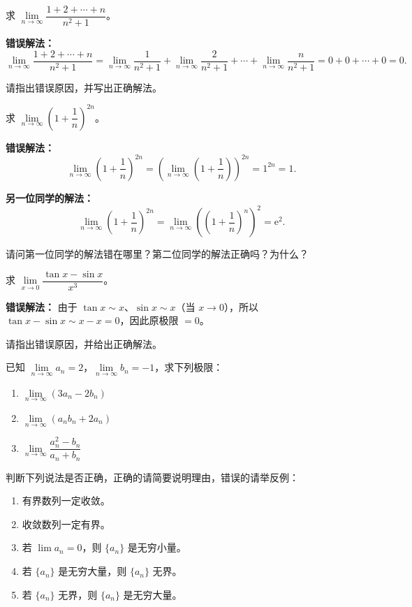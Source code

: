 \documentclass[fontset=fandol]{ctexart}
\newcommand{\ee}{\mathrm{e}}
\begin{document}
\begin{exercise}
求 \(\lim\limits_{n\to\infty} \dfrac{1 + 2 + \cdots + n}{n^2 + 1}\)。

\textbf{错误解法：}
\[
\lim_{n\to\infty} \dfrac{1 + 2 + \cdots + n}{n^2 + 1} = \lim_{n\to\infty} \dfrac{1}{n^2+1} + \lim_{n\to\infty} \dfrac{2}{n^2+1} + \cdots + \lim_{n\to\infty} \dfrac{n}{n^2+1} = 0 + 0 + \cdots + 0 = 0.
\]

请指出错误原因，并写出正确解法。
\end{exercise}

\begin{exercise}
求 \(\lim\limits_{n\to\infty} \left(1 + \dfrac{1}{n}\right)^{2n}\)。

\textbf{错误解法：}
\[
\lim_{n\to\infty} \left(1 + \dfrac{1}{n}\right)^{2n} = \left(\lim_{n\to\infty} \left(1 + \dfrac{1}{n}\right)\right)^{2n} = 1 ^{2n}=1.
\]

\textbf{另一位同学的解法：}
\[
\lim_{n\to\infty} \left(1 + \dfrac{1}{n}\right)^{2n} = \lim_{n\to\infty} \left(\left(1 + \dfrac{1}{n}\right)^n\right)^2 = \ee^2.
\]

请问第一位同学的解法错在哪里？第二位同学的解法正确吗？为什么？
\end{exercise}

\begin{exercise}
求 \(\lim\limits_{x\to 0} \dfrac{\tan x - \sin x}{x^3}\)。

\textbf{错误解法：}
由于 \(\tan x \sim x\)、\(\sin x\sim x\)（当 \(x \to 0\)），所以 \(\tan x-\sin x\sim x-x=0\)，因此原极限 \(=0\)。

请指出错误原因，并给出正确解法。
\end{exercise}

\begin{exercise}已知 \(\lim\limits_{n\to\infty} a_n = 2\)，\(\lim\limits_{n\to\infty} b_n = -1\)，求下列极限：
\begin{enumerate}
\item \(\lim\limits_{n\to\infty} (3a_n - 2b_n)\)
\item \(\lim\limits_{n\to\infty} (a_n b_n + 2a_n)\)
\item \(\lim\limits_{n\to\infty} \dfrac{a_n^2 - b_n}{a_n + b_n}\)
\end{enumerate}
\end{exercise}

\begin{exercise}判断下列说法是否正确，正确的请简要说明理由，错误的请举反例：
\begin{enumerate}
\item 有界数列一定收敛。
\item 收敛数列一定有界。
\item 若 \(\lim a_n = 0\)，则 \(\{a_n\}\) 是无穷小量。
\item 若 \(\{a_n\}\) 是无穷大量，则 \(\{a_n\}\) 无界。
\item 若 \(\{a_n\}\) 无界，则 \(\{a_n\}\) 是无穷大量。
\end{enumerate}
\end{exercise}
\end{document}
